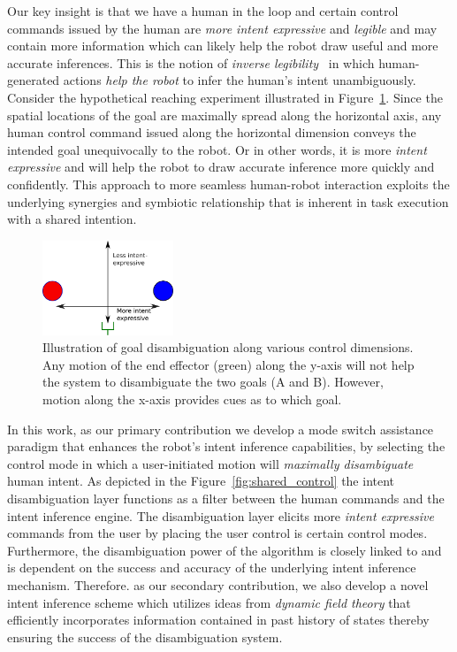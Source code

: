 Our key insight is that we have a human in the loop and certain control commands issued by the human are \textit{more intent expressive} and \textit{legible} and may contain more information which can likely help the robot draw useful and more accurate inferences. This is the notion of \textit{inverse legibility}~\cite{gopinath2017mode} in which human-generated actions \textit{help the robot} to infer the human's intent unambiguously. Consider the hypothetical reaching experiment illustrated in Figure~\ref{fig:disamb}. Since the spatial locations of the goal are maximally spread along the horizontal axis, any human control command issued along the horizontal dimension conveys the intended goal unequivocally to the robot. Or in other words, it is more \textit{intent expressive} and will help the robot to draw accurate inference more quickly and confidently. This approach to more seamless human-robot interaction exploits the underlying synergies and symbiotic relationship that is inherent in task execution with a shared intention. 
\begin{figure}
	\begin{center}
		\includegraphics[width=0.35\textwidth]{./figures/Fig1_Disamb.eps}
	\end{center}
	\caption{Illustration of goal disambiguation along various control dimensions. Any motion of the end effector (green) along the y-axis will not help the system to disambiguate the two goals (A and B). However, motion along the x-axis provides cues as to which goal.}
	\label{fig:disamb}
\end{figure}

In this work, as our primary contribution we develop a mode switch assistance paradigm that enhances the robot's intent inference capabilities, by selecting the control mode in which a user-initiated motion will \textit{maximally disambiguate} human intent. As depicted in the Figure~\ref{fig:shared_control} the intent disambiguation layer functions as a filter between the human commands and the intent inference engine. The disambiguation layer elicits more \textit{intent expressive} commands from the user by placing the user control is certain control modes. Furthermore, the disambiguation power of the algorithm is closely linked to and is dependent on the success and accuracy of the underlying intent inference mechanism. Therefore. as our secondary contribution, we also develop a novel intent inference scheme which utilizes ideas from \textit{dynamic field theory} that efficiently incorporates information contained in past history of states thereby ensuring the success of the disambiguation system. 


